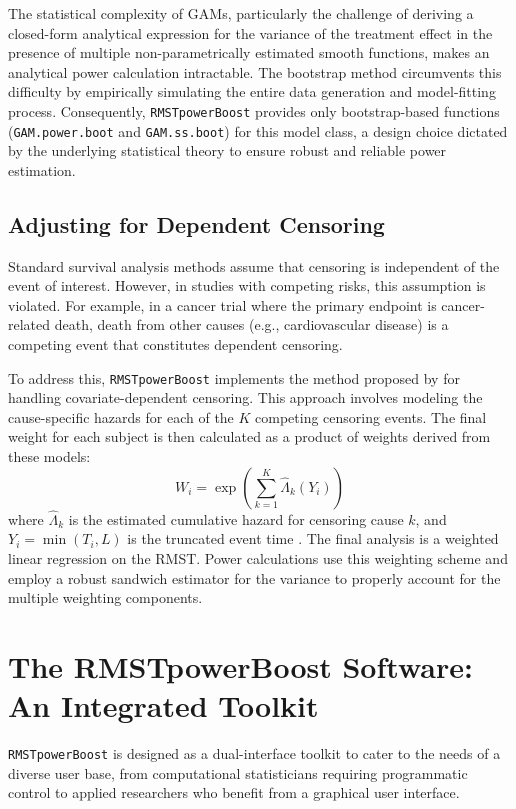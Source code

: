 \documentclass[11pt, a4paper]{article}
\begin{document}
The statistical complexity of GAMs, particularly the challenge of deriving a closed-form analytical expression for the variance of the treatment effect in the presence of multiple non-parametrically estimated smooth functions, makes an analytical power calculation intractable. The bootstrap method circumvents this difficulty by empirically simulating the entire data generation and model-fitting process. Consequently, \texttt{RMSTpowerBoost} provides only bootstrap-based functions (\texttt{GAM.power.boot} and \texttt{GAM.ss.boot}) for this model class, a design choice dictated by the underlying statistical theory to ensure robust and reliable power estimation.

\subsection{Adjusting for Dependent Censoring}
Standard survival analysis methods assume that censoring is independent of the event of interest. However, in studies with competing risks, this assumption is violated. For example, in a cancer trial where the primary endpoint is cancer-related death, death from other causes (e.g., cardiovascular disease) is a competing event that constitutes dependent censoring.

To address this, \texttt{RMSTpowerBoost} implements the method proposed by \citet{wang2018} for handling covariate-dependent censoring. This approach involves modeling the cause-specific hazards for each of the $K$ competing censoring events. The final weight for each subject is then calculated as a product of weights derived from these models:
\begin{equation}
W_i = \exp\left(\sum_{k=1}^{K} \hat{\Lambda}_{k}(Y_i)\right)
\end{equation}
where $\hat{\Lambda}_{k}$ is the estimated cumulative hazard for censoring cause $k$, and $Y_i = \min(T_i, L)$ is the truncated event time \cite{[1]}. The final analysis is a weighted linear regression on the RMST. Power calculations use this weighting scheme and employ a robust sandwich estimator for the variance to properly account for the multiple weighting components.

\section{The RMSTpowerBoost Software: An Integrated Toolkit}
\texttt{RMSTpowerBoost} is designed as a dual-interface toolkit to cater to the needs of a diverse user base, from computational statisticians requiring programmatic control to applied researchers who benefit from a graphical user interface.
\end{document}
